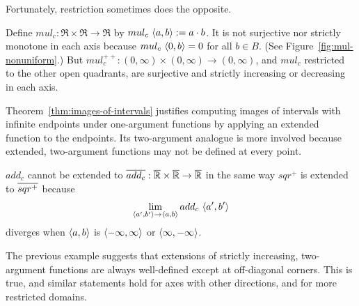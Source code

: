 Fortunately, restriction sometimes does the opposite.

\begin{example}
\label{ex:mul-nonuniform}
Define $mul_c : \Re \times \Re \to \Re$ by $mul_c~\langle{a,b}\rangle := a \cdot b$.
It is not surjective nor strictly monotone in each axis because $mul_c~\langle{0,b}\rangle = 0$ for all $b \in B$.
(See Figure~\ref{fig:mul-nonuniform}.)
But $mul_c^{++} : (0,\infty) \times (0,\infty) \to (0,\infty)$, and $mul_c$ restricted to the other open quadrants, are surjective and strictly increasing or decreasing in each axis.
\exampleqed
\end{example}

Theorem~\ref{thm:images-of-intervals} justifies computing images of intervals with infinite endpoints under one-argument functions by applying an extended function to the endpoints.
Its two-argument analogue is more involved because extended, two-argument functions may not be defined at every point.

\begin{example}
$add_c$ cannot be extended to $\cl{add_c} : \cl{\Re} \times \cl{\Re} \to \cl{\Re}$ in the same way $sqr^+$ is extended to $\cl{sqr^+}$ because
\begin{equation}
	\lim_{\langle{a',b'}\rangle \to \langle{a,b}\rangle} add_c~\langle{a',b'}\rangle
\end{equation}
diverges when $\langle{a,b}\rangle$ is $\langle{-\infty,\infty}\rangle$ or $\langle{\infty,-\infty}\rangle$.
\exampleqed
\end{example}

The previous example suggests that extensions of strictly increasing, two-argument functions are always well-defined except at off-diagonal corners.
This is true, and similar statements hold for axes with other directions, and for more restricted domains.

